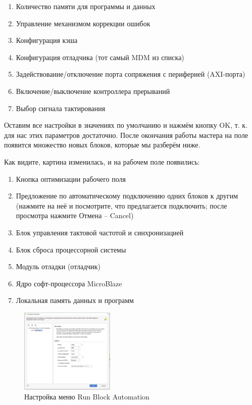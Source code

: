 \documentclass[a4paper,oneside ,14pt]{extreport}
\begin{document}
\begin{enumerate}
    \item Количество памяти для программы и данных
    \item Управление механизмом коррекции ошибок
    \item Конфигурация кэша
    \item Конфигурация отладчика (тот самый MDM из списка)
    \item Задействование/отключение порта сопряжения с периферией (AXI-порта)
    \item Включение/выключение контроллера прерываний
    \item Выбор сигнала тактирования
\end{enumerate}

Оставим все настройки в значениях по умолчанию и нажмём кнопку OK, т. к. 
для нас этих параметров достаточно. После окончания работы мастера на поле 
появится множество новых блоков, которые мы разберём ниже. 

Как видите, картина изменилась, и на рабочем поле появились:
\begin{enumerate}
	\item Кнопка оптимизации рабочего поля
	\item Предложение по автоматическому подключению одних блоков к другим
(нажмите на неё и посмотрите, что предлагается подключить; после просмотра 
нажмите Отмена – Cancel)
      \item Блок управления тактовой частотой и синхронизацией
	\item Блок сброса процессорной системы
	\item Модуль отладки (отладчик)
	\item Ядро софт-процессора MicroBlaze
	\item Локальная память данных и программ
\end{enumerate}

\begin{figure}[!ht]
	\centering
	\includegraphics[width=0.4\textwidth]{image/m_18.png}
	\caption{Настройка меню Run Block Automation}
	\label{m_18}
\end{figure}
\end{document}
